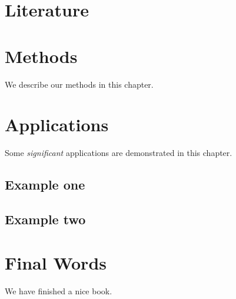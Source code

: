 \documentclass[]{book}
\begin{document}
\hypertarget{literature}{%
\chapter{Literature}\label{literature}}

\hypertarget{methods}{%
\chapter{Methods}\label{methods}}

We describe our methods in this chapter.

\hypertarget{applications}{%
\chapter{Applications}\label{applications}}

Some \emph{significant} applications are demonstrated in this chapter.

\hypertarget{example-one}{%
\section{Example one}\label{example-one}}

\hypertarget{example-two}{%
\section{Example two}\label{example-two}}

\hypertarget{final-words}{%
\chapter{Final Words}\label{final-words}}

We have finished a nice book.


\end{document}
